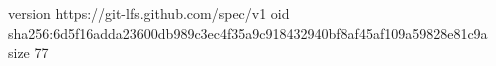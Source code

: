 version https://git-lfs.github.com/spec/v1
oid sha256:6d5f16adda23600db989c3ec4f35a9c918432940bf8af45af109a59828e81c9a
size 77
